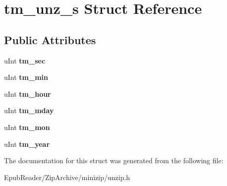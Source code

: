 \hypertarget{structtm__unz__s}{\section{tm\-\_\-unz\-\_\-s Struct Reference}
\label{structtm__unz__s}
}
\subsection*{Public Attributes}
\begin{DoxyCompactItemize}
\item 
\hypertarget{structtm__unz__s_ab91e69a9869e5db5be51b1aebaa5ea0d}{u\-Int {\bfseries tm\-\_\-sec}}\label{structtm__unz__s_ab91e69a9869e5db5be51b1aebaa5ea0d}

\item 
\hypertarget{structtm__unz__s_ac5a6bf08a4c5db8ae2243d4f0c35b192}{u\-Int {\bfseries tm\-\_\-min}}\label{structtm__unz__s_ac5a6bf08a4c5db8ae2243d4f0c35b192}

\item 
\hypertarget{structtm__unz__s_ada09255f794d6c2db07ef73b77266b9c}{u\-Int {\bfseries tm\-\_\-hour}}\label{structtm__unz__s_ada09255f794d6c2db07ef73b77266b9c}

\item 
\hypertarget{structtm__unz__s_a51ed1873e1dcabf08ff0f85caf8aefee}{u\-Int {\bfseries tm\-\_\-mday}}\label{structtm__unz__s_a51ed1873e1dcabf08ff0f85caf8aefee}

\item 
\hypertarget{structtm__unz__s_a4f5e461d8cad18d1aff7ec012168111d}{u\-Int {\bfseries tm\-\_\-mon}}\label{structtm__unz__s_a4f5e461d8cad18d1aff7ec012168111d}

\item 
\hypertarget{structtm__unz__s_a5f17147e3cfbbfdbeb2e29cbc1df8136}{u\-Int {\bfseries tm\-\_\-year}}\label{structtm__unz__s_a5f17147e3cfbbfdbeb2e29cbc1df8136}

\end{DoxyCompactItemize}


The documentation for this struct was generated from the following file\-:\begin{DoxyCompactItemize}
\item 
Epub\-Reader/\-Zip\-Archive/minizip/unzip.\-h\end{DoxyCompactItemize}
